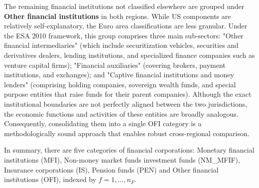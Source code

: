 The remaining financial institutions not classified elsewhere are grouped under \textbf{Other financial institutions} in both regions. While US components are relatively self-explanatory, the Euro area classifications are less granular.  Under the ESA 2010 framework, this group comprises three main sub-sectors: "Other financial intermediaries" (which include securitization vehicles, securities and derivatives dealers, lending institutions, and specialized finance companies such as venture capital firms); "Financial auxiliaries" (covering brokers, payment institutions, and exchanges); and "Captive financial institutions and money lenders" (comprising holding companies, sovereign wealth funds, and special purpose entities that raise funds for their parent companies). Although the exact institutional boundaries are not perfectly aligned between the two jurisdictions, the economic functions and activities of these entities are broadly analogous. Consequently, consolidating them into a single OFI category is a methodologically sound approach that enables robust cross-regional comparison.

In summary, there are five categories of financial corporations: Monetary financial institutions (MFI), Non-money market funds investment funds (NM\_MFIF), Insurance corporations (IS), Pension funds (PEN) and Other financial institutions (OFI), indexed by $f = 1, \dots, n_F$.  

